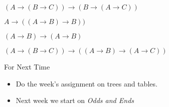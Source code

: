 \documentclass[
  ignorenonframetext,
]{beamer}
\providecommand{\tightlist}{%
  \setlength{\itemsep}{0pt}\setlength{\parskip}{0pt}}
\renewcommand{\,}{\text{, }}
\begin{document}
\begin{frame}{\((A \rightarrow (B \rightarrow C)) \rightarrow (B \rightarrow (A \rightarrow C))\)}
\protect\hypertarget{a-rightarrow-b-rightarrow-c-rightarrow-b-rightarrow-a-rightarrow-c}{}

\end{frame}

\begin{frame}{\(A \rightarrow ((A \rightarrow B) \rightarrow B))\)}
\protect\hypertarget{a-rightarrow-a-rightarrow-b-rightarrow-b}{}

\end{frame}

\begin{frame}{\((A \rightarrow B) \rightarrow (A \rightarrow B)\)}
\protect\hypertarget{a-rightarrow-b-rightarrow-a-rightarrow-b}{}

\end{frame}

\begin{frame}{\((A \rightarrow (B \rightarrow C)) \rightarrow ((A \rightarrow B) \rightarrow (A \rightarrow C))\)}
\protect\hypertarget{a-rightarrow-b-rightarrow-c-rightarrow-a-rightarrow-b-rightarrow-a-rightarrow-c}{}

\end{frame}

\begin{frame}{For Next Time}
\protect\hypertarget{for-next-time}{}

\begin{itemize}
\tightlist
\item
  Do the week's assignment on trees and tables.
\item
  Next week we start on \emph{Odds and Ends}
\end{itemize}

\end{frame}
\end{document}
